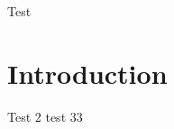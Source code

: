 \documentclass{standalone}
\begin{document}

Test
\lipsum[1]

\section{Introduction}

 \lipsum[1]
Test 2 \cite{greenwade93}
test 33

\cite{goossens93}

\end{document}

